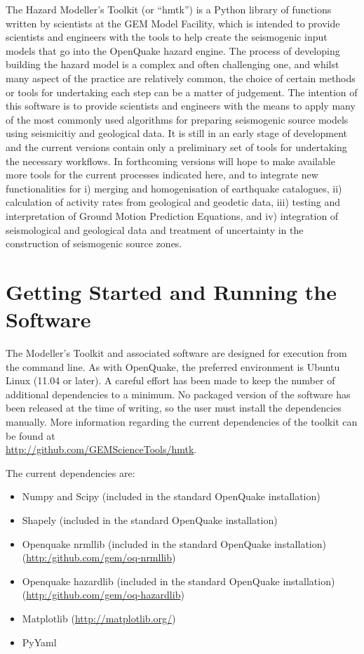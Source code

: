 The Hazard Modeller's Toolkit (or ``hmtk'') is a Python library of functions written by scientists at the GEM Model Facility, which is intended to provide 
scientists and engineers with the tools to help create the seismogenic 
input models that go into the OpenQuake hazard engine. The process of 
developing building the hazard model is a complex and often challenging 
one, and whilst many aspect of the practice are relatively common, the 
choice of certain methods or tools for undertaking each step can be a 
matter of judgement. The intention of this software is to provide 
scientists and engineers with the means to apply many of the most 
commonly used algorithms for preparing seismogenic source models 
using seismicitiy and geological data. It is still in an early 
stage of development and the current versions contain only a preliminary
set of tools for undertaking the necessary workflows. In forthcoming 
versions will hope to make available more tools for the current processes
indicated here, and to integrate new functionalities for i) merging and
homogenisation of earthquake catalogues, ii) calculation of activity 
rates from geological and geodetic data, iii) testing and interpretation
of Ground Motion Prediction Equations, and iv) integration of 
seismological and geological data and treatment of uncertainty 
in the construction of seismogenic source zones.

\section{Getting Started and Running the Software}
The Modeller's Toolkit and associated software are designed for execution 
from the command line. As with OpenQuake, the preferred environment is 
Ubuntu Linux (11.04 or later). A careful effort has been made to keep 
the number of additional dependencies to a minimum. No packaged version of the software has been released at the time of writing, so the user must install the dependencies manually. More information regarding the current dependencies of the toolkit can be found at \hfill \\
\href{http://github.com/GEMScienceTools/hmtk}{http://github.com/GEMScienceTools/hmtk}. 

The current dependencies are:
\begin{itemize}
\item Numpy and Scipy (included in the standard OpenQuake installation)
\item Shapely (included in the standard OpenQuake installation)
\item Openquake nrmllib (included in the standard OpenQuake installation) 
    \hfill \\ (\href{http:/github.com/gem/oq-nrmllib}{http:/github.com/gem/oq-nrmllib}) 
\item Openquake hazardlib (included in the standard OpenQuake installation) 
    \hfill \\ (\href{http:/github.com/gem/oq-hazardlib}{http:/github.com/gem/oq-hazardlib})
\item Matplotlib (\href{http://matplotlib.org/}{http://matplotlib.org/})
\item PyYaml
\end{itemize}

